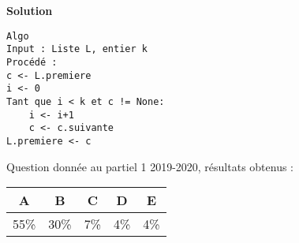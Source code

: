 \begin{exercice}[2019 -- 2020]
\textbf{Solution}


\begin{lstlisting}
Algo
Input : Liste L, entier k
Procédé :
c <- L.premiere
i <- 0
Tant que i < k et c != None:
    i <- i+1
    c <- c.suivante
L.premiere <- c
\end{lstlisting}


Question donnée au partiel 1 2019-2020, résultats obtenus :

\begin{tabular}{|c|c|c|c|c|}
\hline
A & B & C & D & E \\ \hline
55\% & 30\% & 7\% & 4\% & 4\% \\ \hline
\end{tabular} 



\end{exercice}
